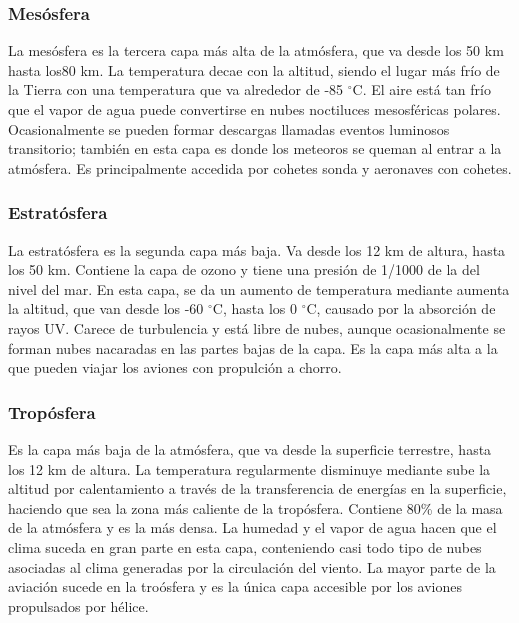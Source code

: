 \documentclass{article}
\begin{document}
\subsubsection{Mesósfera}
La mesósfera es la tercera capa más alta de la atmósfera, que va desde los 50 km hasta los80 km. La temperatura decae con la altitud, siendo el lugar más frío de la Tierra con una temperatura que va alrededor de -85 $^\circ$C. El aire está tan frío que el vapor de agua puede convertirse en nubes noctiluces mesosféricas polares. Ocasionalmente se pueden formar descargas llamadas eventos luminosos transitorio; también en esta capa es donde los meteoros se queman al entrar a la atmósfera. Es principalmente accedida por cohetes sonda y  aeronaves con cohetes. 
\subsubsection{Estratósfera}
La estratósfera es la segunda capa más baja. Va desde los 12 km de altura, hasta los 50 km. Contiene la capa de ozono y tiene una presión de 1/1000 de la del nivel del mar. En esta capa, se da un aumento de temperatura mediante aumenta la altitud, que van desde los -60 $^\circ$C, hasta los 0 $^\circ$C, causado por la absorción de rayos UV. Carece de turbulencia y está libre de nubes, aunque ocasionalmente se forman nubes nacaradas en las partes bajas de la capa. Es la capa más alta a la que pueden viajar los aviones con propulción a chorro.
\subsubsection{Tropósfera}
Es la capa más baja de la atmósfera, que va desde la superficie terrestre, hasta los 12 km de altura. La temperatura regularmente disminuye mediante sube la altitud por calentamiento a través de la transferencia de energías en la superficie, haciendo que sea la zona más caliente de la tropósfera. Contiene 80\% de la masa de la atmósfera y es la más densa. La humedad y el vapor de agua hacen que el clima suceda en gran parte en esta capa, conteniendo casi todo tipo de nubes asociadas al clima generadas por la circulación del viento. La mayor parte de la aviación sucede en la troósfera y es la única capa accesible por los  aviones propulsados por hélice. 
\end{document}

